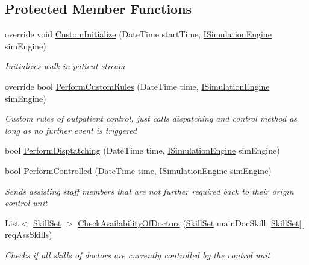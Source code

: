 \subsection*{Protected Member Functions}
\begin{DoxyCompactItemize}
\item 
override void \hyperlink{class_sample_hospital_model_1_1_outpatient_1_1_control_unit_outpatient_medium_a82f44f37914ead8e9db5ec5c49eb5149}{Custom\+Initialize} (Date\+Time start\+Time, \hyperlink{interface_simulation_core_1_1_simulation_classes_1_1_i_simulation_engine}{I\+Simulation\+Engine} sim\+Engine)
\begin{DoxyCompactList}\small\item\em Initializes walk in patient stream \end{DoxyCompactList}\item 
override bool \hyperlink{class_sample_hospital_model_1_1_outpatient_1_1_control_unit_outpatient_medium_a17dbc0cf6095a93aaf946236516cf611}{Perform\+Custom\+Rules} (Date\+Time time, \hyperlink{interface_simulation_core_1_1_simulation_classes_1_1_i_simulation_engine}{I\+Simulation\+Engine} sim\+Engine)
\begin{DoxyCompactList}\small\item\em Custom rules of outpatient control, just calls dispatching and control method as long as no further event is triggered \end{DoxyCompactList}\item 
bool \hyperlink{class_sample_hospital_model_1_1_outpatient_1_1_control_unit_outpatient_medium_afc5f1547de0558a6ad31cd5d2ba45677}{Perform\+Disptatching} (Date\+Time time, \hyperlink{interface_simulation_core_1_1_simulation_classes_1_1_i_simulation_engine}{I\+Simulation\+Engine} sim\+Engine)
\item 
bool \hyperlink{class_sample_hospital_model_1_1_outpatient_1_1_control_unit_outpatient_medium_a027e012e8cf6d4bccc201778c47918b4}{Perform\+Controlled} (Date\+Time time, \hyperlink{interface_simulation_core_1_1_simulation_classes_1_1_i_simulation_engine}{I\+Simulation\+Engine} sim\+Engine)
\begin{DoxyCompactList}\small\item\em Sends assisting staff members that are not further required back to their origin control unit \end{DoxyCompactList}\item 
List$<$ \hyperlink{class_simulation_core_1_1_h_c_c_m_elements_1_1_skill_set}{Skill\+Set} $>$ \hyperlink{class_sample_hospital_model_1_1_outpatient_1_1_control_unit_outpatient_medium_ab773bae78fd7bdcf1dc2761b80b057cd}{Check\+Availability\+Of\+Doctors} (\hyperlink{class_simulation_core_1_1_h_c_c_m_elements_1_1_skill_set}{Skill\+Set} main\+Doc\+Skill, \hyperlink{class_simulation_core_1_1_h_c_c_m_elements_1_1_skill_set}{Skill\+Set}\mbox{[}$\,$\mbox{]} req\+Ass\+Skills)
\begin{DoxyCompactList}\small\item\em Checks if all skills of doctors are currently controlled by the control unit \end{DoxyCompactList}\end{DoxyCompactItemize}
